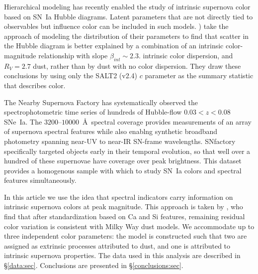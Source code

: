 \documentclass[trackchanges]{aastex61}   	%
\begin{document}
Hierarchical modeling has recently enabled
the study of intrinsic supernova color based on SN~Ia Hubble diagrams. Latent parameters that are not directly tied to observables
but  influence color can be included in such models.
\citet{2017ApJ...842...93M} ) take the approach of modeling the distribution of their parameters to find that
scatter in the Hubble diagram is better explained by a combination of 
an intrinsic color-magnitude relationship with slope $\beta_{\mathit{int}}\sim 2.3$. intrinsic
color dispersion,
and
$R_V=2.7$ dust, rather than by dust with no color dispersion.
They draw these conclusions by using only the SALT2 (v2.4)
 $c$
parameter as the summary statistic that describes color.

The Nearby Supernova Factory \citep[SNfactory;][]{2002SPIE.4836...61A} has systematically observed the
spectrophotometric time series of hundreds of Hubble-flow $0.03<z<0.08$ SNe~Ia.   The $3200$--$10000$~\AA\ spectral coverage
provides measurements of an array of supernova spectral features while also enablng synthetic broadband photometry
spanning near-UV to near-IR SN-frame wavelengths.  SNfactory specifically targeted objects
early in their temporal evolution, so that well over a hundred of these supernovae have  coverage over
peak brightness.  This dataset provides a homogenous sample with which to study SN~Ia colors and spectral features simultaneously.

In this article we use the idea that spectral indicators carry information on intrinsic supernova colors at peak magnitude.
This approach is taken by \citet{2011A&A...529L...4C}, who find that after standardization based on Ca and Si features, remaining residual color
variation is consistent with Milky Way dust models.
We accommodate up to  three independent color parameters: the model is constructed such that 
two are assigned as extrinsic processes attributed to dust, and one is attributed to intrinsic supernova
properties.
The data used in this analysis are described in \S\ref{data:sec}.
Conclusions are presented in \S\ref{conclusions:sec}.
\end{document}
